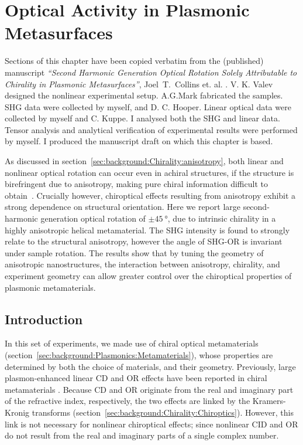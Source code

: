 \chapter{Optical Activity in Plasmonic Metasurfaces}\label{sec:results:OAinPlanarNanohelices}

Sections of this chapter have been copied verbatim from the (published) manuscript \textit{``Second Harmonic Generation Optical Rotation Solely Attributable to Chirality in Plasmonic Metasurfaces''}, Joel~T.~Collins et. al. \cite{Collins2018b}.
V. K. Valev designed the nonlinear experimental setup. A.G.Mark fabricated the samples. SHG data were collected by myself, and D. C. Hooper. Linear optical data were collected by myself and C. Kuppe. I analysed both the SHG and linear data. Tensor analysis and analytical verification of experimental results were performed by myself. I produced the manuscript draft on which this chapter is based.

\bigskip \noindent
As discussed in section~\ref{sec:background:Chirality:anisotropy}, both linear and nonlinear optical rotation can occur even in achiral structures, if the structure is birefringent due to anisotropy, making pure chiral information difficult to obtain~\cite{Hooper2017}. Crucially however, chiroptical effects resulting from anisotropy exhibit a strong dependence on structural orientation. Here we report large second-harmonic generation optical rotation of $\pm\SI{45}{\degree}$, due to intrinsic chirality in a highly anisotropic helical metamaterial. The SHG intensity is found to strongly relate to the structural anisotropy, however the angle of SHG-OR is invariant under sample rotation. The results show that by tuning the geometry of anisotropic nanostructures, the interaction between anisotropy, chirality, and experiment geometry can allow greater control over the chiroptical properties of plasmonic metamaterials.

\section{Introduction}\label{sec:results:OAinPlanarNanohelices:introduction}
In this set of experiments, we made use of chiral optical metamaterials (section~\ref{sec:background:Plasmonics:Metamaterials}), whose properties are determined by both the choice of materials, and their geometry. Previously, large plasmon-enhanced linear CD and OR effects have been reported in chiral metamaterials \cite{Decker2007, Papakostas2003, Kuwata-Gonokami2005a, Plum2007, Gansel2011}.
Because CD and OR originate from the real and imaginary part of the refractive index, respectively, the two effects are linked by the Kramers-Kronig transforms (section~\ref{sec:background:Chirality:Chiroptics}).
However, this link is not necessary for nonlinear chiroptical effects; since nonlinear CID and OR do not result from the real and imaginary parts of a single complex number.

